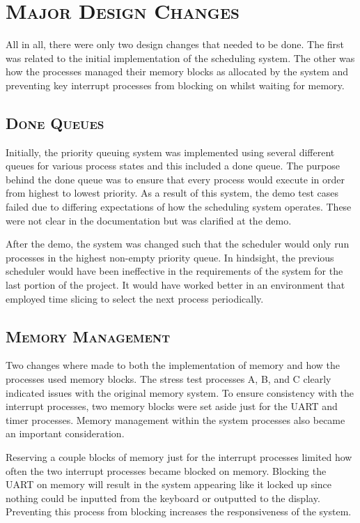 \documentclass[oneside]{report}
\begin{document}
\chapter{\textsc{Major Design Changes}}
All in all, there were only two design changes that needed to be done. The
first was related to the initial implementation of the scheduling system. The
other was how the processes managed their memory blocks as allocated by the
system and preventing key interrupt processes from blocking on whilst waiting
for memory.

\section{\textsc{Done Queues}}
Initially, the priority queuing system was implemented using several different
queues for various process states and this included a done queue. The purpose
behind the done queue was to ensure that every process would execute in order
from highest to lowest priority. As a result of this system, the demo test
cases failed due to differing expectations of how the scheduling system
operates. These were not clear in the documentation but was clarified at the
demo.

After the demo, the system was changed such that the scheduler would only run
processes in the highest non-empty priority queue. In hindsight, the previous
scheduler would have been ineffective in the requirements of the system for the
last portion of the project. It would have worked better in an environment that
employed time slicing to select the next process periodically.

\section{\textsc{Memory Management}}
Two changes where made to both the implementation of memory and how the
processes used memory blocks. The stress test processes A, B, and C clearly
indicated issues with the original memory system. To ensure consistency with
the interrupt processes, two memory blocks were set aside just for the UART and
timer processes. Memory management within the system processes also became an
important consideration.

Reserving a couple blocks of memory just for the interrupt processes limited
how often the two interrupt processes became blocked on memory. Blocking the
UART on memory will result in the system appearing like it locked up since
nothing could be inputted from the keyboard or outputted to the display.
Preventing this process from blocking increases the responsiveness of the
system.
\end{document}
